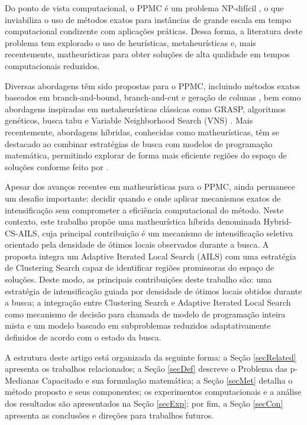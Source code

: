 \documentclass[a4paper,11pt]{article}
\begin{document}
Do ponto de vista computacional, o PPMC é um problema NP-difícil \citep{garey1990guide}, o que inviabiliza o uso de métodos exatos para instâncias de grande escala em tempo computacional condizente com aplicações práticas. Dessa forma, a literatura deste problema tem explorado o uso de heurísticas, metaheurísticas e, mais recentemente, matheurísticas para obter soluções de alta qualidade em tempos computacionais reduzidos.

Diversas abordagens têm sido propostas para o PPMC, incluindo métodos exatos baseados em branch-and-bound, branch-and-cut e geração de colunas \citep{mulvey1984solving, lorena2004column, boccia2008cut}, bem como abordagens inspiradas em metaheurísticas clássicas como GRASP, algoritmos genéticos, busca tabu e Variable Neighborhood Search (VNS) \citep{osman1994capacitated,correa2004genetic, diaz2006hybrid,fleszar2008effective}. Mais recentemente, abordagens híbridas, conhecidas como matheurísticas, têm se destacado ao combinar estratégias de busca com modelos de programação matemática, permitindo explorar de forma mais eficiente regiões do espaço de soluções conforme feito por  \cite{stefanello2015matheuristics}.

Apesar dos avanços recentes em matheurísticas para o PPMC, ainda permanece um desafio importante: decidir quando e onde aplicar mecanismos exatos de intensificação sem comprometer a eficiência computacional do método. Neste contexto, este trabalho propõe uma matheurística híbrida denominada Hybrid-CS-AILS, cuja principal contribuição é um mecanismo de intensificação seletiva orientado pela densidade de ótimos locais observados durante a busca. A proposta integra um Adaptive Iterated Local Search (AILS) \citep{lourenco2003iterated} com uma estratégia de Clustering Search \cite{oliveira2013clustering} capaz de identificar regiões promissoras do espaço de soluções. Deste modo, as principais contribuições deste trabalho são: uma estratégia de intensificação guiada por densidade de ótimos locais obtidos durante a busca; a integração entre Clustering Search e Adaptive Iterated Local Search como mecanismo de decisão para chamada de modelo de programação inteira mista e um modelo baseado em subproblemas reduzidos adaptativamente definidos de acordo com o estado da busca. 

A estrutura deste artigo está organizada da seguinte forma: a Seção \ref{secRelated} apresenta os trabalhos relacionados; a Seção \ref{secDef} descreve o Problema das p-Medianas Capacitado e sua formulação matemática; a Seção \ref{secMet} detalha o método proposto e seus componentes; os experimentos computacionais e a análise dos resultados são apresentados na Seção \ref{secExp}; por fim, a Seção \ref{secCon} apresenta as conclusões e direções para trabalhos futuros.
\end{document}
